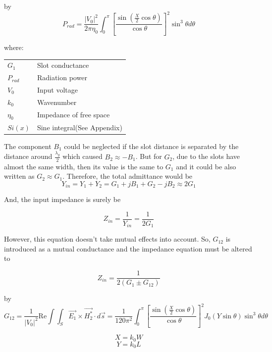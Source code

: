 \documentclass[11pt,a4paper]{article}
\makeatletter
\newenvironment{conditions}[1][where:]
  {#1 \begin{tabular}[t]{>{$}l<{$} @{${}={}$} l}}
  {\end{tabular}}
\makeatother
\begin{document}
by
\begin{equation}
	P_{rad} = \frac{|V_0|^2}{2\pi\eta_0} \int_{0}^{\pi} \left[\frac{\sin\left(\frac{X}{2}\cos{\theta}\right)}{\cos{\theta}}\right]^2 \sin^3{\theta} d\theta
\end{equation}

\begin{conditions}
 		G_1    	 	&	Slot conductance \\
        P_{rad}    	&	Radiation power \\
 		V_0     	&	Input voltage \\   
 		k_0			&	Wavenumber \\
 		\eta_0		&	Impedance of free space\\
        Si(x)		&	Sine integral(See Appendix)\\
\end{conditions}

\newpage
The component $B_1$ could be neglected if the slot distance is separated by the distance around $\frac{\lambda_g}{2}$ which caused $B_2 \approx -B_1$. But for $G_2$, due to the slots have almost the same width, then its value is the same to $G_1$ and it could be also written as $G_2 \approx G_1$. Therefore, the total admittance would be
\begin{equation}
Y_{in} = Y_1 + Y_2 = G_1 + jB_1 + G_2 - jB_2 \approx 2G_1
\end{equation}

And, the input impedance is surely be

\begin{equation}
Z_{in} = \frac{1}{Y_{in}} = \frac{1}{2G_1}
\end{equation}

However, this equation doesn't take mutual effects into account. So, $G_{12}$ is introduced as a mutual conductance and the impedance equation must be altered to\cite{CoB:05}

\begin{equation}
Z_{in} = \frac{1}{2(G_1 \pm G_{12})}
\end{equation}

by
\begin{equation}
G_{12} = \frac{1}{|V_0|^2}\textrm{Re}\int\int_{S}\vec{E_1} \times \vec{H^*_2} \cdot d\vec{s} = \frac{1}{120\pi^2} \int_{0}^{\pi} \left[\frac{\sin\left(\frac{X}{2}\cos{\theta}\right)}{\cos{\theta}}\right]^2 J_0(Y\sin{\theta}) \sin^3{\theta} d\theta
\end{equation}

\begin{equation}
X = k_0W
\end{equation}
\begin{equation}
Y = k_0L
\end{equation}
\end{document}
